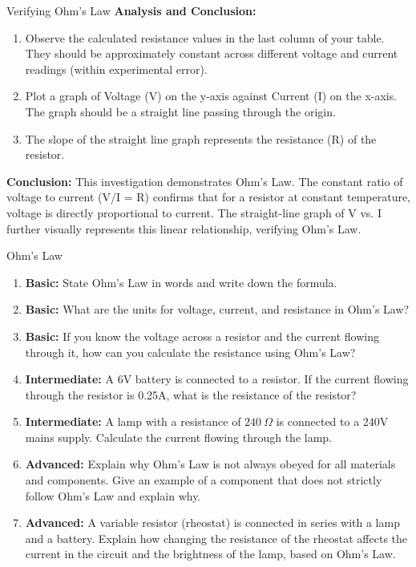 \begin{investigation}{Verifying Ohm's Law}
\textbf{Analysis and Conclusion:}
\begin{enumerate}
    \item Observe the calculated resistance values in the last column of your table.  They should be approximately constant across different voltage and current readings (within experimental error).
    \item Plot a graph of Voltage (V) on the y-axis against Current (I) on the x-axis. The graph should be a straight line passing through the origin.
    \item The slope of the straight line graph represents the resistance (R) of the resistor.
\end{enumerate}

\textbf{Conclusion:}
This investigation demonstrates Ohm's Law. The constant ratio of voltage to current (V/I = R) confirms that for a resistor at constant temperature, voltage is directly proportional to current. The straight-line graph of V vs. I further visually represents this linear relationship, verifying Ohm's Law.
\end{investigation}

\begin{tieredquestions}{Ohm's Law}

\begin{enumerate}
    \item \textbf{Basic:} State Ohm's Law in words and write down the formula.
    \item \textbf{Basic:} What are the units for voltage, current, and resistance in Ohm's Law?
    \item \textbf{Basic:}  If you know the voltage across a resistor and the current flowing through it, how can you calculate the resistance using Ohm's Law?
    \item \textbf{Intermediate:} A 6V battery is connected to a resistor. If the current flowing through the resistor is 0.25A, what is the resistance of the resistor?
    \item \textbf{Intermediate:} A lamp with a resistance of $240\ \Omega$ is connected to a 240V mains supply. Calculate the current flowing through the lamp.
    \item \textbf{Advanced:} Explain why Ohm's Law is not always obeyed for all materials and components.  Give an example of a component that does not strictly follow Ohm's Law and explain why. 
    \item \textbf{Advanced:} A variable resistor (rheostat) is connected in series with a lamp and a battery. Explain how changing the resistance of the rheostat affects the current in the circuit and the brightness of the lamp, based on Ohm's Law.
\end{enumerate}

\end{tieredquestions}

